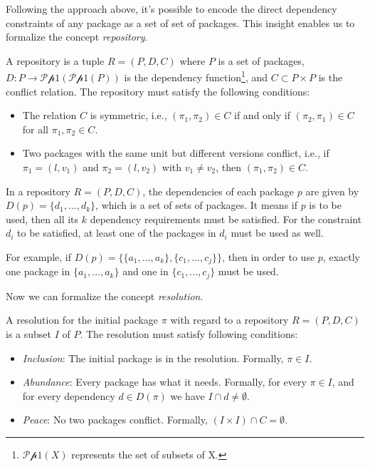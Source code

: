 Following the approach above, it's possible to encode the direct dependency constraints of any package as a set of set of packages. This insight enables us to formalize the concept \emph{repository}\cite{mancinelli2006managing}.

\begin{definition}[Repository]
  A repository is a tuple $R = (P, D, C)$ where $P$ is a set of packages, $D : P \rightarrow \mathscr{P p 1}(\mathscr{P p 1}(P))$ is the dependency function\footnote{$\mathscr{P p 1}(X)$ represents the set of subsets of X.}, and $C \subset P \times P$ is the conflict relation. The repository must satisfy the following conditions:

  \begin{itemize}
  \item The relation $C$ is symmetric, i.e., $(\pi_1, \pi_2) \in C$ if and only if $(\pi_2, \pi_1) \in C$ for all $\pi_1, \pi_2 \in C$.
  \item Two packages with the same unit but different versions conflict, i.e., if $\pi_1 = (l, v_1)$ and $\pi_2 = (l, v_2)$ with $v_1 \neq v_2$, then $(\pi_1, \pi_2) \in C$.
  \end{itemize}
\end{definition}

In a repository $R = (P, D, C)$, the dependencies of each package $p$ are given by $D(p) = \{d_1, ..., d_k\}$, which is a set of sets of packages. It means if $p$ is to be used, then all its $k$ dependency requirements must be satisfied. For the constraint $d_i$ to be satisfied, at least one of the packages in $d_i$ must be used as well.

For example, if $D(p) = \{\{a_1, ..., a_k\}, \{c_1, ..., c_j\}\}$, then in order to use $p$, exactly one package in $\{a_1, ..., a_k\}$ and one in $\{c_1, ..., c_j\}$ must be used.

Now we can formalize the concept \emph{resolution}.

\begin{definition}[Resolution]
  A resolution for the initial package $\pi$ with regard to a repository $R = (P, D, C)$ is a subset $I$ of $P$. The resolution must satisfy following conditions:

  \begin{itemize}
  \item \emph{Inclusion}: The initial package is in the resolution. Formally, $\pi \in I$.
  \item \emph{Abundance}: Every package has what it needs. Formally, for every $\pi \in I$, and for every dependency $d \in D(\pi)$ we have $I \cap d \neq \emptyset$.
  \item \emph{Peace}: No two packages conflict. Formally, $(I \times I) \cap C = \emptyset$.
  \end{itemize}
\end{definition}

